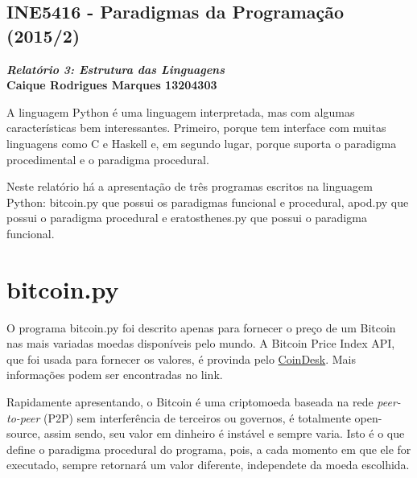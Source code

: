 \documentclass{article}
\begin{document}
\begin{center}
    \section*{INE5416 - Paradigmas da Programação (2015/2)}
    \textbf{\textit{Relatório 3: Estrutura das Linguagens} \\
    Caique Rodrigues Marques 13204303}
\end{center}

A linguagem Python é uma linguagem interpretada, mas com algumas
características bem interessantes. Primeiro, porque tem interface com muitas
linguagens como C e Haskell e, em segundo lugar, porque suporta o paradigma
procedimental e o paradigma procedural.

Neste relatório há a apresentação de três programas escritos na linguagem
Python: bitcoin.py que possui os paradigmas funcional e procedural, apod.py que
possui o paradigma procedural e eratosthenes.py que possui o paradigma
funcional.

\section*{bitcoin.py}
O programa bitcoin.py foi descrito apenas para fornecer o preço de um Bitcoin
nas mais variadas moedas disponíveis pelo mundo. A Bitcoin Price Index API, que
foi usada para fornecer os valores, é provinda pelo
\href{http://www.coindesk.com/api/}{CoinDesk}. Mais informações podem ser
encontradas no link.

Rapidamente apresentando, o Bitcoin é uma criptomoeda baseada na rede
\textit{peer-to-peer} (P2P) sem interferência de terceiros ou governos, é
totalmente open-source, assim sendo, seu valor em dinheiro é instável e sempre
varia. Isto é o que define o paradigma procedural do programa, pois, a cada
momento em que ele for executado, sempre retornará um valor diferente,
independete da moeda escolhida.
\end{document}
